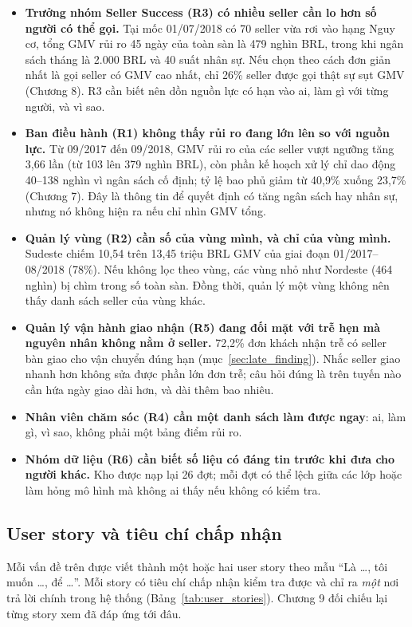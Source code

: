 \begin{itemize}
    \item \textbf{Trưởng nhóm Seller Success (R3) có nhiều seller cần lo hơn số người có thể gọi.} Tại mốc 01/07/2018 có 70 seller vừa rơi vào hạng Nguy cơ, tổng GMV rủi ro 45 ngày của toàn sàn là 479 nghìn BRL, trong khi ngân sách tháng là 2.000 BRL và 40 suất nhân sự. Nếu chọn theo cách đơn giản nhất là gọi seller có GMV cao nhất, chỉ 26\% seller được gọi thật sự sụt GMV (Chương 8). R3 cần biết nên dồn nguồn lực có hạn vào ai, làm gì với từng người, và vì sao.
    \item \textbf{Ban điều hành (R1) không thấy rủi ro đang lớn lên so với nguồn lực.} Từ 09/2017 đến 09/2018, GMV rủi ro của các seller vượt ngưỡng tăng 3,66 lần (từ 103 lên 379 nghìn BRL), còn phần kế hoạch xử lý chỉ dao động 40--138 nghìn vì ngân sách cố định; tỷ lệ bao phủ giảm từ 40,9\% xuống 23,7\% (Chương 7). Đây là thông tin để quyết định có tăng ngân sách hay nhân sự, nhưng nó không hiện ra nếu chỉ nhìn GMV tổng.
    \item \textbf{Quản lý vùng (R2) cần số của vùng mình, và chỉ của vùng mình.} Sudeste chiếm 10,54 trên 13,45 triệu BRL GMV của giai đoạn 01/2017--08/2018 (78\%). Nếu không lọc theo vùng, các vùng nhỏ như Nordeste (464 nghìn) bị chìm trong số toàn sàn. Đồng thời, quản lý một vùng không nên thấy danh sách seller của vùng khác.
    \item \textbf{Quản lý vận hành giao nhận (R5) đang đối mặt với trễ hẹn mà nguyên nhân không nằm ở seller.} 72,2\% đơn khách nhận trễ có seller bàn giao cho vận chuyển đúng hạn (mục~\ref{sec:late_finding}). Nhắc seller giao nhanh hơn không sửa được phần lớn đơn trễ; câu hỏi đúng là trên tuyến nào cần hứa ngày giao dài hơn, và dài thêm bao nhiêu.
    \item \textbf{Nhân viên chăm sóc (R4) cần một danh sách làm được ngay}: ai, làm gì, vì sao, không phải một bảng điểm rủi ro.
    \item \textbf{Nhóm dữ liệu (R6) cần biết số liệu có đáng tin trước khi đưa cho người khác.} Kho được nạp lại 26 đợt; mỗi đợt có thể lệch giữa các lớp hoặc làm hỏng mô hình mà không ai thấy nếu không có kiểm tra.
\end{itemize}

\subsection{User story và tiêu chí chấp nhận}
Mỗi vấn đề trên được viết thành một hoặc hai user story theo mẫu ``Là \ldots, tôi muốn \ldots, để \ldots''. Mỗi story có tiêu chí chấp nhận kiểm tra được và chỉ ra \emph{một} nơi trả lời chính trong hệ thống (Bảng~\ref{tab:user_stories}). Chương 9 đối chiếu lại từng story xem đã đáp ứng tới đâu.


